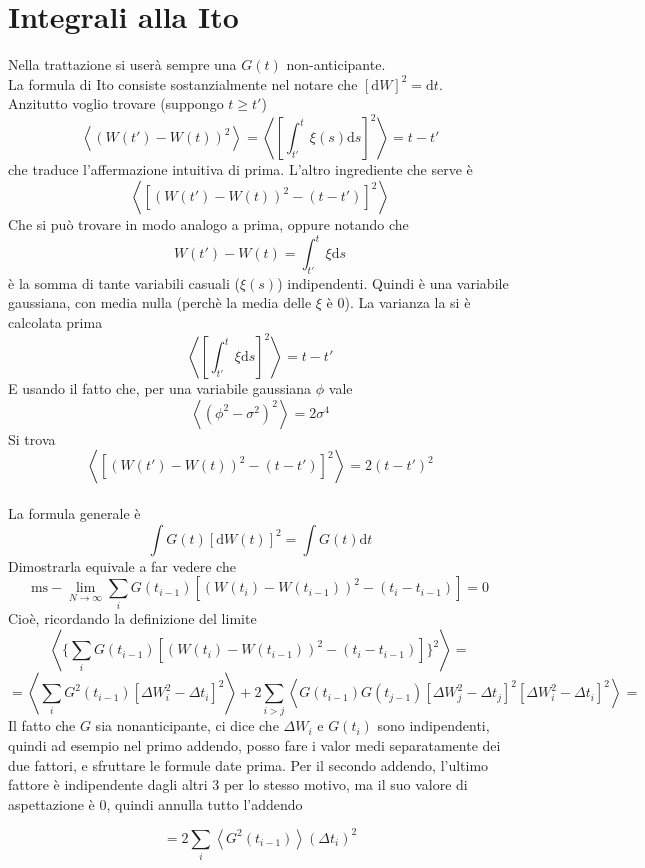 \documentclass[a4paper,12pt]{article}
\theoremstyle{plain}
\theoremstyle{definition}
\newcommand{\ave}[1]{\left\langle#1\right\rangle }
\renewcommand{\d}{\text{d}}
\newcommand{\ra}{\rightarrow}
\theoremstyle{remark}
\begin{document}
\section{Integrali alla Ito}\label{ito}
Nella trattazione si userà sempre una $G(t)$ non-anticipante.\\La formula di Ito consiste sostanzialmente nel notare che $[\d W]^2=\d t$.
\\
Anzitutto voglio trovare  (suppongo $t\ge t'$)
\[\ave{\left(W(t')-W(t)\right)^2}=\ave{[\int_{t'}^t\xi (s) \d s]^2}=t-t'	\]
che traduce l'affermazione intuitiva di prima.
L'altro ingrediente che serve è
\[\ave{\left[\left(W(t')-W(t)\right)^2-(t-t')\right]^2}\]
Che si può trovare in modo analogo a prima, oppure notando che 
\[W(t')-W(t)=\int_{t'}^t \xi \d s	\]
è la somma di tante variabili casuali ($\xi(s)$) indipendenti. Quindi è una variabile gaussiana, con media nulla (perchè la media delle $\xi$ è 0). La varianza la si è calcolata prima
\[\ave{[\int_{t'}^t \xi \d s	]^2}=t-t'\]
E usando il fatto che, per una variabile gaussiana $\phi$ vale
\[\ave{(\phi^2-\sigma^2)^2}=2\sigma^4\]
Si trova \[\ave{\left[\left(W(t')-W(t)\right)^2-(t-t')\right]^2}=2\left(t-t'\right)^2\]
\\
La formula generale è
\[\int G(t) [\d W(t)]^2=\int G(t)\d t	\]
Dimostrarla equivale a far vedere che \[\text{ms}-\lim_{N\ra \infty} {\sum_i G(t_{i-1})[(W(t_i)-W(t_{i-1}))^2-(t_{i}-t_{i-1})]}=0		\] Cioè, ricordando la definizione del limite
\[\ave{\{\sum_i G(t_{i-1})[(W(t_i)-W(t_{i-1}))^2-(t_{i}-t_{i-1})]\}^2}=\]\[=
\ave{\sum_i G^2(t_{i-1})[\Delta W_i^2-\Delta t_i]^2}+2\sum_{i> j}\ave{G(t_{i-1})G(t_{j-1})	[\Delta W_j^2-\Delta t_j]^2[\Delta W_i^2-\Delta t_i]^2}	=\]
Il fatto che $G$ sia nonanticipante, ci dice che $\Delta W_i$ e $G(t_i)$ sono indipendenti, quindi ad esempio nel primo addendo, posso fare i valor medi separatamente dei due fattori, e sfruttare le formule date prima. Per il secondo addendo, l'ultimo fattore è indipendente dagli altri 3 per lo stesso motivo, ma il suo valore di aspettazione è 0, quindi annulla tutto l'addendo

\[=2\sum_i\ave{ G^2(t_{i-1})}(\Delta t_i)^2 \]
\end{document}
